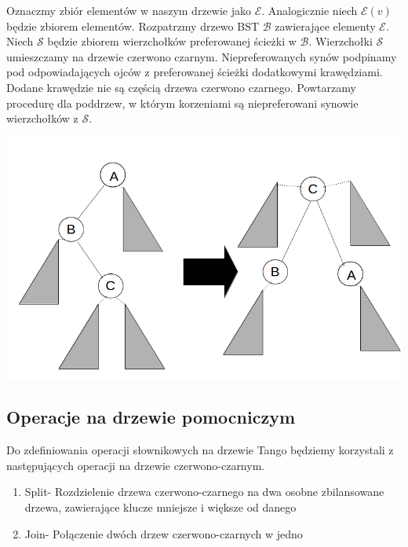 \documentclass[declaration,shortabstract]{iithesis}
\theoremstyle{thm}
\theoremstyle{remark}
\theoremstyle{plain}
\theoremstyle{plain}
\theoremstyle{plain}
\begin{document}
Oznaczmy zbiór elementów w naszym drzewie jako \(\mathcal{E}\). Analogicznie niech \(\mathcal{E}(v)\) będzie zbiorem elementów. Rozpatrzmy drzewo BST \(\mathcal{B}\) zawierające elementy \(\mathcal{E}\). Niech \( \mathcal{S}\) będzie zbiorem wierzchołków preferowanej ścieżki w \(\mathcal{B}\). Wierzchołki \(\mathcal{S}\) umieszczamy na drzewie czerwono czarnym. Niepreferowanych synów podpinamy pod odpowiadających ojców z preferowanej ścieżki dodatkowymi krawędziami. Dodane krawędzie nie są częścią drzewa czerwono czarnego. Powtarzamy procedurę dla poddrzew, w którym korzeniami są niepreferowani synowie wierzchołków z \(\mathcal{S}\).  

\includegraphics[scale=0.5]{Tango_path2.png}  

\subsection{Operacje na drzewie pomocniczym} Do zdefiniowania operacji słownikowych na drzewie Tango będziemy korzystali z następujących operacji na drzewie czerwono-czarnym. 
\begin{enumerate} 
\item{Split- Rozdzielenie drzewa czerwono-czarnego na dwa osobne zbilansowane drzewa, zawierające klucze mniejsze i większe od danego} 
\item{Join- Połączenie dwóch drzew czerwono-czarnych w jedno} 
\end{enumerate} 
\end{document}

